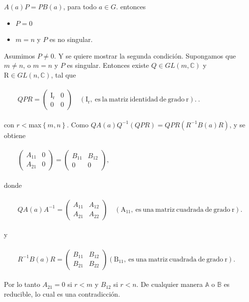 \documentclass[12pt]{book}
\theoremstyle{definition}
\newcounter{in}
\begin{document}
$A(a)P=PB(a)$, para todo $a \in G$.
entonces\\
\begin{itemize}
\item $P=0$
\item $m=n$ y $P$ es no singular.
\end{itemize}
Asumimos $P \neq 0$. Y se quiere mostrar la segunda condición. Supongamos que $m \neq n$, o $m=n$ y $P$ es singular. Entonces existe $Q \in GL(m,\mathbb{C})$ y $\mathrm{R} \in GL(n,\mathbb{C})$, tal que\\~\\
$\qquad
QPR=
\begin{pmatrix}
\mathrm{I_{r}} & 0 \\ 
0 & 0
\end{pmatrix} \quad \mathrm{(I_{r},\ es\ la\ matriz\ identidad\ de\ grado\ r).\ }$.\\~\\
con $r<$max$\left\{ m,n \right\}$. Como $QA(a)Q^{-1}(QPR) = QPR(R^{-1}B(a)R)$, y se obtiene\\~\\
$\qquad
\begin{pmatrix}
A_{11} & 0 \\ 
A_{21} & 0
\end{pmatrix}
=
\begin{pmatrix}
B_{11} & B_{12} \\ 
0 & 0
\end{pmatrix},$ \\~\\
donde \\~\\
$\qquad
QA(a)A^{-1}=
\begin{pmatrix}
A_{11} & A_{12} \\ 
A_{21} & A_{22}
\end{pmatrix} \quad \mathrm{(A_{11},\ es\ una\ matriz\ cuadrada\ de\ grado\ r).\ }$\\~\\
y \\~\\
$\qquad
R^{-1}B(a)R=
\begin{pmatrix}
B_{11} & B_{12} \\ 
B_{21} & B_{22}
\end{pmatrix} \mathrm{(B_{11},\ es\ una\ matriz\ cuadrada\ de\ grado\ r).\ }$\\~\\
Por lo tanto $A_{21}=0$ si $r<m$ y $B_{12}$ si $r<n$. De cualquier manera $\mathbb{A}$ o $\mathbb{B}$ es reducible, lo cual es una contradicción.\\~\\
\end{document}
